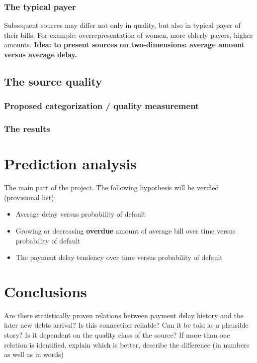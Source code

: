 \documentclass{article}
\begin{document}
\subsubsection{The typical payer}

Subsequent sources may differ not only in quality, but also in typical payer of their bills. For example: overrepresentation of women, more elderly payers, higher amounts. \textbf{Idea: to present sources on two-dimensions: average amount versus average delay. }

\subsection{The source quality}

\subsubsection{Proposed categorization / quality measurement}

\subsubsection{The results}

\pagebreak

\section{Prediction analysis}

The main part of the project. The following hypothesis will be verified (provisional list):
\begin{itemize}
    \item Average delay versus probability of default
    \item Growing or decreasing \textbf{overdue} amount of average bill over time versus probability of default
    \item The payment delay tendency over time versus probability of default
\end{itemize}

\pagebreak

\section{Conclusions}

Are there statistically proven relations between payment delay history and the later new debts arrival?
Is this connection reliable? Can it be told as a plausible story? Is it dependent on the quality class of the source? If more than one relation is identified, explain which is better, describe the difference (in numbers as well as in words)
\end{document}
